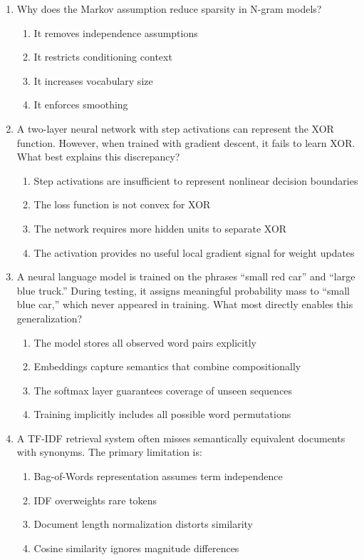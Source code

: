 \documentclass[12pt]{article}
\begin{document}
\begin{enumerate}[label=Q\arabic*.]
 \item Why does the Markov assumption reduce sparsity in N-gram models?
 \begin{enumerate}[label=(\Alph*)]
     \item It removes independence assumptions
     \item It restricts conditioning context
     \item It increases vocabulary size
     \item It enforces smoothing
 \end{enumerate}
 
 \item A two-layer neural network with step activations can represent the XOR function. However, when trained with gradient descent, it fails to learn XOR. What best explains this discrepancy?
 \begin{enumerate}[label=(\Alph*)]
     \item Step activations are insufficient to represent nonlinear decision boundaries
     \item The loss function is not convex for XOR
     \item The network requires more hidden units to separate XOR
     \item The activation provides no useful local gradient signal for weight updates
 \end{enumerate}
 
 \item A neural language model is trained on the phrases ``small red car'' and ``large blue truck.'' During testing, it assigns meaningful probability mass to ``small blue car,'' which never appeared in training. What most directly enables this generalization?
 \begin{enumerate}[label=(\Alph*)]
     \item The model stores all observed word pairs explicitly
     \item Embeddings capture semantics that combine compositionally
     \item The softmax layer guarantees coverage of unseen sequences
     \item Training implicitly includes all possible word permutations
 \end{enumerate}
 
 \item A TF-IDF retrieval system often misses semantically equivalent documents with synonyms. The primary limitation is:
 \begin{enumerate}[label=(\Alph*)]
     \item Bag-of-Words representation assumes term independence
     \item IDF overweights rare tokens
     \item Document length normalization distorts similarity
     \item Cosine similarity ignores magnitude differences
 \end{enumerate}
 

\end{enumerate}
\end{document}
